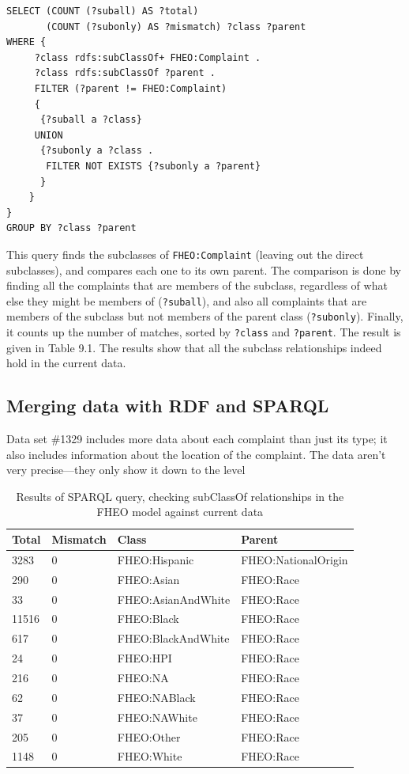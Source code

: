 \begin{lstlisting}
SELECT (COUNT (?suball) AS ?total) 
       (COUNT (?subonly) AS ?mismatch) ?class ?parent
WHERE {
     ?class rdfs:subClassOf+ FHEO:Complaint .
     ?class rdfs:subClassOf ?parent .
     FILTER (?parent != FHEO:Complaint)
     {
      {?suball a ?class}
     UNION
      {?subonly a ?class .
       FILTER NOT EXISTS {?subonly a ?parent}
      }
    }
}
GROUP BY ?class ?parent
\end{lstlisting}

This query finds the subclasses of \texttt{FHEO:Complaint} (leaving out the
direct subclasses), and compares each one to its own parent. The
comparison is done by finding all the complaints that are members of the
subclass, regardless of what else they might be members of (\texttt{?suball}),
and also all complaints that are members of the subclass but not members
of the parent class (\texttt{?subonly}). Finally, it counts up the number of
matches, sorted by \texttt{?class} and \texttt{?parent}. The result is given in Table 9.1.
The results show that all the subclass relationships indeed hold in the
current data.

\subsection{Merging data with RDF and SPARQL}

Data set \#1329 includes more data about each complaint than just its
type; it also includes information about the location of the complaint.
The data aren't very precise---they only show it down to the level


\begin{table}
\caption{Results of SPARQL query, checking subClassOf relationships in
the FHEO model against current data}
\begin{tabular}{|llll|}
\hline
Total&Mismatch&Class&Parent\\
\hline
3283&0&FHEO:Hispanic&FHEO:NationalOrigin\\
290&0&FHEO:Asian&FHEO:Race\\
33&0&FHEO:AsianAndWhite&FHEO:Race\\
11516&0&FHEO:Black&FHEO:Race\\
617&0&FHEO:BlackAndWhite&FHEO:Race\\
24&0&FHEO:HPI&FHEO:Race\\
216&0&FHEO:NA&FHEO:Race\\
62&0&FHEO:NABlack&FHEO:Race\\
37&0&FHEO:NAWhite&FHEO:Race\\
205&0&FHEO:Other&FHEO:Race\\
1148&0&FHEO:White&FHEO:Race\\
\hline
\end{tabular}
\label{tab:ch10.1}
\end{table}

